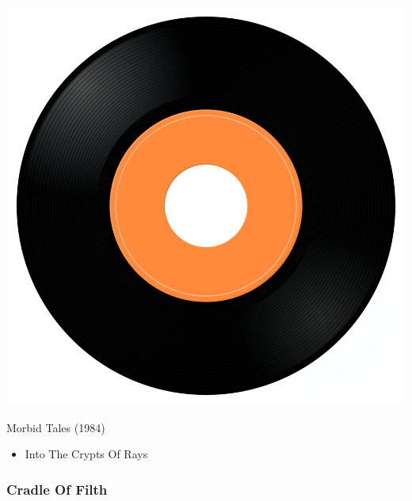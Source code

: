 \begin{minipage}[t]{0.25\textwidth}\vspace{0pt}
\captionsetup{type=figure}
\includegraphics[width=\textwidth]{Images/cover.png}
\caption*{Morbid Tales (1984)}
\end{minipage}
\begin{minipage}[t]{0.25\textwidth}\vspace{0pt}
\begin{itemize}[nosep,leftmargin=1em,labelwidth=*,align=left]
	\setlength{\itemsep}{0pt}
	\item Into The Crypts Of Rays
\end{itemize}
\end{minipage}

\subsubsection{Cradle Of Filth}

